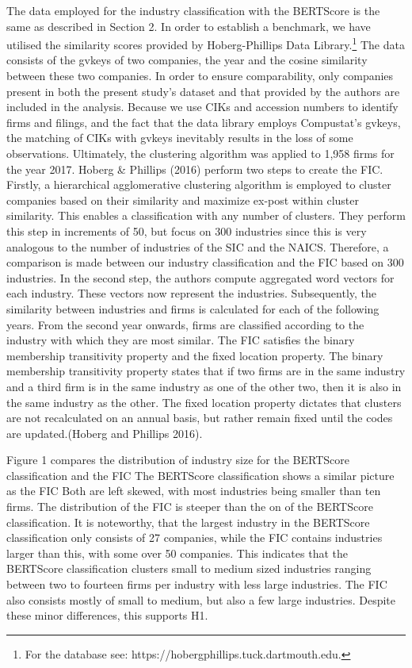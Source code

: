 \documentclass[
]{article}
\begin{document}
The data employed for the industry classification with the BERTScore is
the same as described in Section 2. In order to establish a benchmark,
we have utilised the similarity scores provided by Hoberg-Phillips Data
Library.\footnote{For the database see:
  https://hobergphillips.tuck.dartmouth.edu.} The data consists of the
gvkeys of two companies, the year and the cosine similarity between
these two companies. In order to ensure comparability, only companies
present in both the present study's dataset and that provided by the
authors are included in the analysis. Because we use CIKs and accession
numbers to identify firms and filings, and the fact that the data
library employs Compustat's gvkeys, the matching of CIKs with gvkeys
inevitably results in the loss of some observations. Ultimately, the
clustering algorithm was applied to 1,958 firms for the year 2017.
Hoberg \& Phillips (2016) perform two steps to create the FIC. Firstly,
a hierarchical agglomerative clustering algorithm is employed to cluster
companies based on their similarity and maximize ex-post within cluster
similarity. This enables a classification with any number of clusters.
They perform this step in increments of 50, but focus on 300 industries
since this is very analogous to the number of industries of the SIC and
the NAICS. Therefore, a comparison is made between our industry
classification and the FIC based on 300 industries. In the second step,
the authors compute aggregated word vectors for each industry. These
vectors now represent the industries. Subsequently, the similarity
between industries and firms is calculated for each of the following
years. From the second year onwards, firms are classified according to
the industry with which they are most similar. The FIC satisfies the
binary membership transitivity property and the fixed location property.
The binary membership transitivity property states that if two firms are
in the same industry and a third firm is in the same industry as one of
the other two, then it is also in the same industry as the other. The
fixed location property dictates that clusters are not recalculated on
an annual basis, but rather remain fixed until the codes are
updated.(Hoberg and Phillips 2016).

Figure 1 compares the distribution of industry size for the BERTScore
classification and the FIC The BERTScore classification shows a similar
picture as the FIC Both are left skewed, with most industries being
smaller than ten firms. The distribution of the FIC is steeper than the
on of the BERTScore classification. It is noteworthy, that the largest
industry in the BERTScore classification only consists of 27 companies,
while the FIC contains industries larger than this, with some over 50
companies. This indicates that the BERTScore classification clusters
small to medium sized industries ranging between two to fourteen firms
per industry with less large industries. The FIC also consists mostly of
small to medium, but also a few large industries. Despite these minor
differences, this supports H1.
\end{document}
